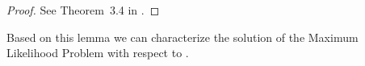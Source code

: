 \begin{lemma}
\end{lemma}
\begin{proof}
    See Theorem~3.4 in \cite{wainwright_graphical_2008}.
\end{proof}

Based on this lemma we can characterize the solution of the Maximum Likelihood Problem  with respect to \HybridLogicNetworks{}.

